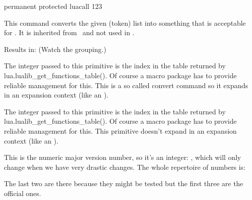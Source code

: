 \starttyping
permanent protected luacall 123
\stoptyping

\stopnewprimitive

\startnewprimitive[title={\prm {luaescapestring}}]

This command converts the given (token) list into something that is acceptable
for \LUA. It is inherited from \LUATEX\ and not used in \CONTEXT.

\startbuffer
{}
\stopbuffer

\typebuffer

Results in: \inlinebuffer\space (Watch the grouping.)

\stopnewprimitive

\startnewprimitive[title={\prm {luafunction}}]

The integer passed to this primitive is the index in the table returned by \typ
{lua.lualib_get_functions_table()}. Of course a macro package has to provide
reliable management for this. This is a so called convert command so it expands
in an expansion context (like an ).

\stopnewprimitive

\startnewprimitive[title={\prm {luafunctioncall}}]

The integer passed to this primitive is the index in the table returned by \typ
{lua.lualib_get_functions_table()}. Of course a macro package has to provide
reliable management for this. This primitive doesn't expand in an expansion
context (like an ).

\stopnewprimitive

\startnewprimitive[title={\prm {luametatexmajorversion}}]

This is the numeric major version number, so it's an integer: \the
\luametatexmajorversion, which will only change when we have very drastic
changes. The whole repertoire of numbers is:

\starttabulate
\NC \type {\the\luametatexmajorversion} \NC \the\luametatexmajorversion \NC \NR
\NC \type {\the\luametatexminorversion} \NC \the\luametatexminorversion \NC \NR
\NC \type {\the\luametatexrelease}      \NC \the\luametatexrelease      \NC \NR
\NC \type {\the\luatexversion}          \NC \the\luatexversion          \NC \NR
\NC \type {\the\luatexrevision}         \NC \the\luatexrevision         \NC \NR
\stoptabulate

The last two are there because they might be tested but the first three are the
official ones.

